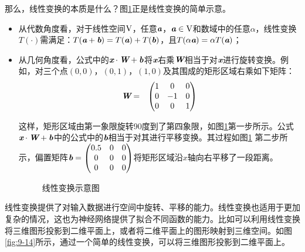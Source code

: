 \parinterval 那么，线性变换的本质是什么？图\ref{fig:9-13}正是线性变换的简单示意。

\begin{itemize}
\vspace{0.5em}
\item 从代数角度看，对于线性空间$ \textrm V $，任意$ {\textbf{\em a}}$，${\textbf{\em a}}\in {\textrm V} $和数域中的任意$ \alpha $，线性变换$ T(\cdot) $需满足：$ T({\textbf{\em a}}+{\textbf{\em b}})=T({\textbf{\em a}})+T({\textbf{\em b}}) $，且$ T(\alpha {\textbf{\em a}})=\alpha T({\textbf{\em a}}) $；
\vspace{0.5em}
\item 从几何角度看，公式中的${\textbf{\em x}}\cdot {\textbf{\em W}}+{\textbf{\em b}}$将${\textbf{\em x}}$右乘${\textbf{\em W}}$相当于对$ {\textbf{\em x}} $进行旋转变换。例如，对三个点$ (0,0) $，$ (0,1) $，$ (1,0) $及其围成的矩形区域右乘如下矩阵：
    \begin{eqnarray}
    {\textbf{\em W}}&=&\begin{pmatrix} 1 & 0 & 0\\ 0 & -1 & 0\\ 0 & 0 & 1\end{pmatrix}
    \label{eq:9-106}
    \end{eqnarray}

    这样，矩形区域由第一象限旋转90度到了第四象限，如图\ref{fig:9-13}第一步所示。公式$ {\textbf{\em x}}\cdot {\textbf{\em W}}+{\textbf{\em b}}$中的公式中的${\textbf{\em b}}$相当于对其进行平移变换。其过程如图\ref{fig:9-13} 第二步所示，偏置矩阵$ {\textbf{\em b}}=\begin{pmatrix} 0.5 & 0 & 0\\ 0 & 0 & 0\\ 0 & 0 & 0\end{pmatrix} $将矩形区域沿$x$轴向右平移了一段距离。

\begin{figure}[htp]
\centering

\caption{线性变换示意图}
\label{fig:9-13}
\end{figure}
\vspace{0.5em}
\end{itemize}


\parinterval 线性变换提供了对输入数据进行空间中旋转、平移的能力。线性变换也适用于更加复杂的情况，这也为神经网络提供了拟合不同函数的能力。比如可以利用线性变换将三维图形投影到二维平面上，或者将二维平面上的图形映射到三维空间。如图\ref{fig:9-14}所示，通过一个简单的线性变换，可以将三维图形投影到二维平面上。

